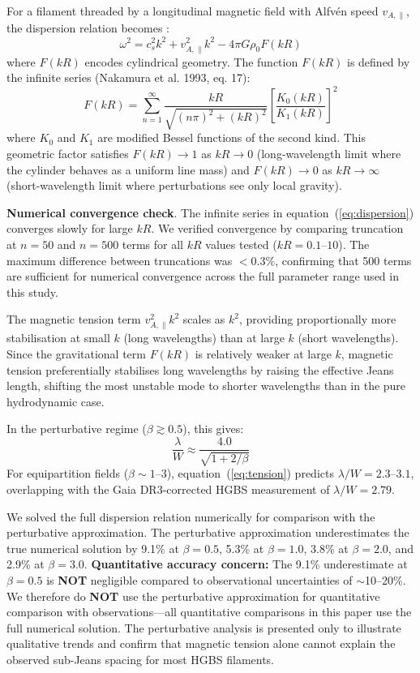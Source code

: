 \documentclass[twocolumn]{mnras}
\begin{document}
For a filament threaded by a longitudinal magnetic field with Alfv\'en speed $v_{A,\parallel}$, the dispersion relation becomes \citep{Nakamura1993}:
\begin{equation}
\omega^2 = c_s^2 k^2 + v_{A,\parallel}^2 k^2 - 4\pi G\rho_0 F(kR)
\label{eq:dispersion}
\end{equation}
where $F(kR)$ encodes cylindrical geometry. The function $F(kR)$ is defined by the infinite series (Nakamura et al. 1993, eq. 17):
\begin{equation}
F(kR) = \sum_{n=1}^{\infty} \frac{kR}{\sqrt{(n\pi)^2 + (kR)^2}} \left[\frac{K_0(kR)}{K_1(kR)}\right]^2
\end{equation}
where $K_0$ and $K_1$ are modified Bessel functions of the second kind. This geometric factor satisfies $F(kR) \to 1$ as $kR \to 0$ (long-wavelength limit where the cylinder behaves as a uniform line mass) and $F(kR) \to 0$ as $kR \to \infty$ (short-wavelength limit where perturbations see only local gravity).

\textbf{Numerical convergence check}. The infinite series in equation~(\ref{eq:dispersion}) converges slowly for large $kR$. We verified convergence by comparing truncation at $n = 50$ and $n = 500$ terms for all $kR$ values tested ($kR = 0.1$--$10$). The maximum difference between truncations was $<0.3\%$, confirming that 500 terms are sufficient for numerical convergence across the full parameter range used in this study.

The magnetic tension term $v_{A,\parallel}^2 k^2$ scales as $k^2$, providing proportionally more stabilisation at small $k$ (long wavelengths) than at large $k$ (short wavelengths). Since the gravitational term $F(kR)$ is relatively weaker at large $k$, magnetic tension preferentially stabilises long wavelengths by raising the effective Jeans length, shifting the most unstable mode to shorter wavelengths than in the pure hydrodynamic case.

In the perturbative regime ($\beta \gtrsim 0.5$), this gives:
\begin{equation}
\frac{\lambda}{W} \approx \frac{4.0}{\sqrt{1 + 2/\beta}}
\label{eq:tension}
\end{equation}
For equipartition fields ($\beta \sim 1$--$3$), equation~(\ref{eq:tension}) predicts $\lambda/W = 2.3$--$3.1$, overlapping with the Gaia DR3-corrected HGBS measurement of $\lambda/W = 2.79$.

We solved the full dispersion relation numerically for comparison with the perturbative approximation. The perturbative approximation underestimates the true numerical solution by 9.1\% at $\beta = 0.5$, 5.3\% at $\beta = 1.0$, 3.8\% at $\beta = 2.0$, and 2.9\% at $\beta = 3.0$. \textbf{Quantitative accuracy concern:} The 9.1\% underestimate at $\beta = 0.5$ is \textbf{NOT} negligible compared to observational uncertainties of $\sim$10--20\%. We therefore do \textbf{NOT} use the perturbative approximation for quantitative comparison with observations---all quantitative comparisons in this paper use the full numerical solution. The perturbative analysis is presented only to illustrate qualitative trends and confirm that magnetic tension alone cannot explain the observed sub-Jeans spacing for most HGBS filaments.
\end{document}
